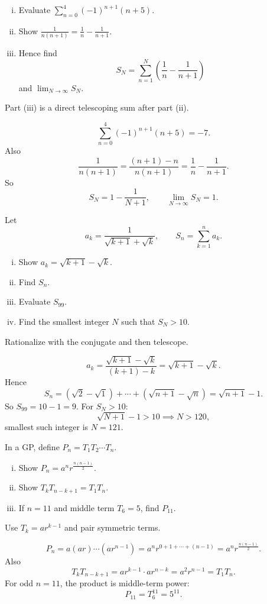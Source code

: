 \begin{problem}
\begin{enumerate}[(i)]
\item Evaluate $\sum_{n=0}^{4}(-1)^{n+1}(n+5)$.
\item Show $\frac{1}{n(n+1)}=\frac1n-\frac1{n+1}$.
\item Hence find
\[
S_N=\sum_{n=1}^N\left(\frac1n-\frac1{n+1}\right)
\]
and $\lim_{N\to\infty}S_N$.
\end{enumerate}
\end{problem}
\begin{hint}
Part (iii) is a direct telescoping sum after part (ii).
\end{hint}
\begin{solution}
\[
\sum_{n=0}^{4}(-1)^{n+1}(n+5)=-7.
\]
Also
\[
\frac1{n(n+1)}=\frac{(n+1)-n}{n(n+1)}=\frac1n-\frac1{n+1}.
\]
So
\[
S_N=1-\frac1{N+1},\qquad \lim_{N\to\infty}S_N=1.
\]
\end{solution}

\begin{problem}
Let
\[
a_k=\frac1{\sqrt{k+1}+\sqrt{k}},\qquad S_n=\sum_{k=1}^n a_k.
\]
\begin{enumerate}[(i)]
\item Show $a_k=\sqrt{k+1}-\sqrt{k}$.
\item Find $S_n$.
\item Evaluate $S_{99}$.
\item Find the smallest integer $N$ such that $S_N>10$.
\end{enumerate}
\end{problem}
\begin{hint}
Rationalize with the conjugate and then telescope.
\end{hint}
\begin{solution}
\[
a_k=\frac{\sqrt{k+1}-\sqrt{k}}{(k+1)-k}=\sqrt{k+1}-\sqrt{k}.
\]
Hence
\[
S_n=(\sqrt2-\sqrt1)+\cdots+(\sqrt{n+1}-\sqrt n)=\sqrt{n+1}-1.
\]
So $S_{99}=10-1=9$.
For $S_N>10$:
\[
\sqrt{N+1}-1>10 \implies N>120,
\]
smallest such integer is $N=121$.
\end{solution}

\begin{problem}
In a GP, define $P_n=T_1T_2\cdots T_n$.
\begin{enumerate}[(i)]
\item Show $P_n=a^n r^{\frac{n(n-1)}2}$.
\item Show $T_kT_{n-k+1}=T_1T_n$.
\item If $n=11$ and middle term $T_6=5$, find $P_{11}$.
\end{enumerate}
\end{problem}
\begin{hint}
Use $T_k=ar^{k-1}$ and pair symmetric terms.
\end{hint}
\begin{solution}
\[
P_n=a(ar)\cdots(ar^{n-1})=a^n r^{0+1+\cdots+(n-1)}=a^n r^{\frac{n(n-1)}2}.
\]
Also
\[
T_kT_{n-k+1}=ar^{k-1}\cdot ar^{n-k}=a^2r^{n-1}=T_1T_n.
\]
For odd $n=11$, the product is middle-term power:
\[
P_{11}=T_6^{11}=5^{11}.
\]
\end{solution}

